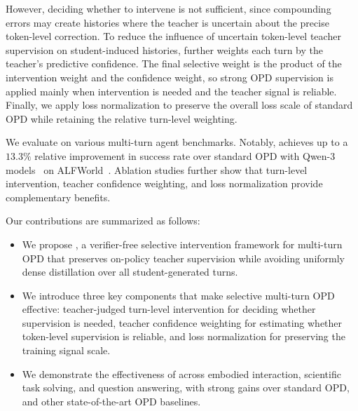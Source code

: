 However, deciding whether to intervene is not sufficient, since compounding errors may create histories where the teacher is uncertain about the precise token-level correction.
%
%
To reduce the influence of uncertain token-level teacher supervision on student-induced histories, \ours{} further weights each turn by the teacher's predictive confidence.
%
The final selective weight is the product of the intervention weight and the confidence weight, so strong OPD supervision is applied mainly when intervention is needed and the teacher signal is reliable.
%
Finally, we apply loss normalization to preserve the overall loss scale of standard OPD while retaining the relative turn-level weighting.

We evaluate \ours on various multi-turn agent benchmarks.
%
Notably, \ours achieves up to a $13.3\%$ relative improvement in success rate over standard OPD with Qwen-3 models~\citep{yang2025qwen3} on ALFWorld~\citep{shridhar2020alfworld}.
%
Ablation studies further show that turn-level intervention, teacher confidence weighting, and loss normalization provide complementary benefits.
%

Our contributions are summarized as follows:
%
\begin{itemize}
    \item We propose \ours{}, a verifier-free selective intervention framework for multi-turn OPD that preserves on-policy teacher supervision while avoiding uniformly dense distillation over all student-generated turns.
    \item We introduce three key components that make selective multi-turn OPD effective: teacher-judged turn-level intervention for deciding whether supervision is needed, teacher confidence weighting for estimating whether token-level supervision is reliable, and loss normalization for preserving the training signal scale.
    \item We demonstrate the effectiveness of \ours{} across embodied interaction, scientific task solving, and question answering, with strong gains over standard OPD, and other state-of-the-art OPD baselines.
\end{itemize}